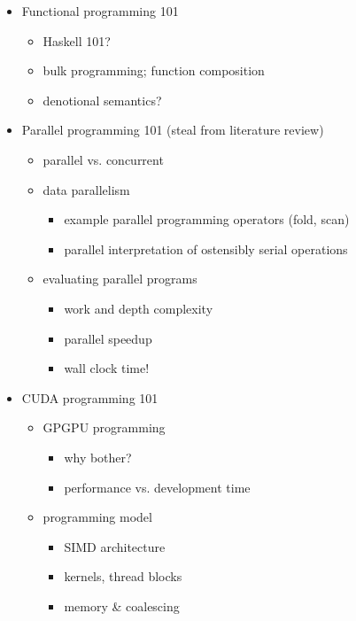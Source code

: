 \begin{itemize}
    \item Functional programming 101
        \begin{itemize}
            \item Haskell 101?
            \item bulk programming; function composition
            \item denotional semantics?
        \end{itemize}

    \item Parallel programming 101 (steal from literature review)
        \begin{itemize}
            \item parallel vs. concurrent
            \item data parallelism
                \begin{itemize}
                    \item example parallel programming operators (fold, scan)
                    \item parallel interpretation of ostensibly serial
                        operations
                \end{itemize}
            \item evaluating parallel programs
                \begin{itemize}
                    \item work and depth complexity
                    \item parallel speedup
                    \item wall clock time!
                \end{itemize}
        \end{itemize}

    \item CUDA programming 101
        \begin{itemize}
            \item GPGPU programming
                \begin{itemize}
                    \item why bother?
                    \item performance vs. development time
                \end{itemize}
            \item programming model
                \begin{itemize}
                    \item SIMD architecture
                    \item kernels, thread blocks
                    \item memory \& coalescing
                \end{itemize}
        \end{itemize}


\end{itemize}
